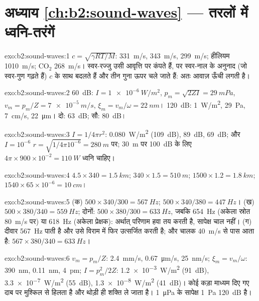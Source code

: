 \section*{अध्याय \ref{ch:b2:sound-waves} --- तरलों में ध्वनि-तरंगें}

\begin{solution}{exo:b2:sound-waves:1}
$c = \sqrt{\gamma RT/M}$: \qty{331}{m/s}, \qty{343}{m/s}, \qty{299}{m/s}; हीलियम
\qty{1010}{m/s}; CO$_2$ \qty{268}{m/s}। स्वर-रज्जु उसी
आवृत्ति पर कंपते हैं, पर स्वर-नाल के अनुनाद (जो स्वर-गुण गढ़ते हैं)
$c$ के साथ बदलते हैं और तीन गुना ऊपर चले जाते हैं: अतः आवाज़ ऊँची
लगती है।
\end{solution}

\begin{solution}{exo:b2:sound-waves:2}
\qty{60}{dB}: $I = \qty{1e-6}{W/m^2}$, $p_m = \sqrt{2ZI} = \qty{29}{mPa}$, $v_m = p_m/Z =
\qty{7e-5}{m/s}$, $\xi_m = v_m/\omega = \qty{22}{nm}$। \qty{120}{dB}: \qty{1}{W/m^2},
\qty{29}{Pa}, \qty{7}{cm/s}, \qty{22}{\micro m}। दो: \qty{63}{dB}; सौ: \qty{80}{dB}।
\end{solution}

\begin{solution}{exo:b2:sound-waves:3}
$I = 1/4\pi r^2$: \qty{0.080}{W/m^2} (\qty{109}{dB}), \qty{89}{dB}, \qty{69}{dB}; और $I = 10^{-6}$
$r = \sqrt{1/4\pi10^{-6}} = \qty{280}{m}$ पर; \qty{30}{m} पर \qty{100}{dB} के लिए $4\pi \times
900 \times 10^{-2} = \qty{110}{W}$ ध्वनि चाहिए।
\end{solution}

\begin{solution}{exo:b2:sound-waves:4}
$4.5 \times 340 = \qty{1.5}{km}$; $340 \times 1.5 = \qty{510}{m}$; $1500 \times 1.2 = \qty{1.8}{km}$;
$1540 \times 65 \times 10^{-6} = \qty{10}{cm}$।
\end{solution}

\begin{solution}{exo:b2:sound-waves:5}
(क) $500 \times 340/300 = \qty{567}{Hz}$; $500 \times 340/380 = \qty{447}{Hz}$। (ख) $500 \times
380/340 = \qty{559}{Hz}$; दोनों: $500 \times 380/300 = \qty{633}{Hz}$, जबकि \qty{654}{Hz}
(अकेला स्रोत \qty{80}{m/s} पर) या \qty{618}{Hz} (अकेला प्रेक्षक): अर्थात् परिणाम हवा तय करती है,
सापेक्ष चाल नहीं। (ग) दीवार \qty{567}{Hz} पाती है
और उसे विराम में फिर उत्सर्जित करती है; और चालक \qty{40}{m/s} से पास आता है: $567 \times
380/340 = \qty{633}{Hz}$।
\end{solution}

\begin{solution}{exo:b2:sound-waves:6}
$v_m = p_m/Z$: \qty{2.4}{mm/s}, \qty{0.67}{\micro m/s}, \qty{25}{nm/s}; $\xi_m = v_m/\omega$:
\qty{390}{nm}, \qty{0.11}{nm}, \qty{4}{pm}; $I = p_m^2/2Z$: \qty{1.2e-3}{W/m^2} (\qty{91}{dB}),
\qty{3.3e-7}{W/m^2} (\qty{55}{dB}), \qty{1.3e-8}{W/m^2} (\qty{41}{dB})। कोई कड़ा माध्यम
दिए गए दाब पर मुश्किल से हिलता है और थोड़ी ही शक्ति ले जाता है।
\qty{1}{\micro Pa} के सापेक्ष \qty{1}{Pa} \qty{120}{dB} है।
\end{solution}

